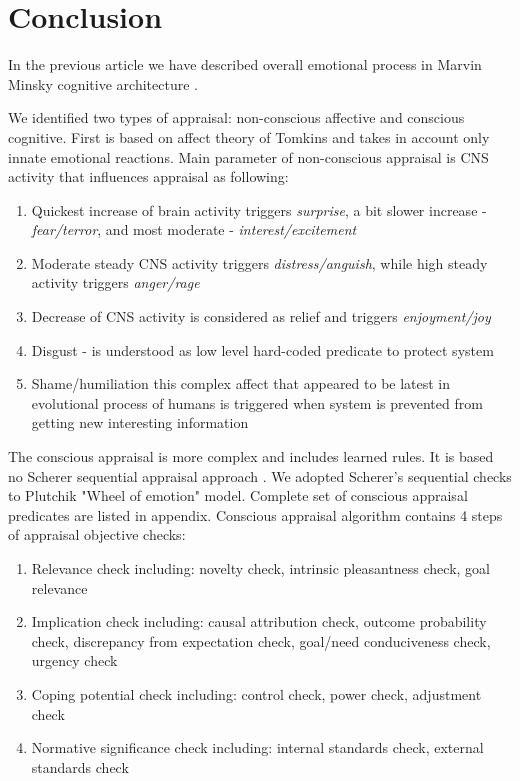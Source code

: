 \section{Conclusion}

In the previous article \cite{computational_emotional_thinking} we have described overall emotional process in Marvin Minsky cognitive architecture \cite{emotionmachine}. 

We identified two types of appraisal: non-conscious affective and conscious cognitive. First is based on affect theory of Tomkins \cite{primer_affect_psychology} and takes in account only innate emotional reactions. Main parameter of non-conscious appraisal is CNS activity that influences appraisal as following:

\begin{enumerate}
 \item  Quickest increase of brain activity triggers \emph{surprise}, a bit slower increase - \emph{fear/terror}, and most moderate - \emph{interest/excitement}
 \item  Moderate steady CNS activity triggers \emph{distress/anguish}, while high steady activity triggers \emph{anger/rage}
 \item  Decrease of CNS activity is considered as relief and triggers \emph{enjoyment/joy}
 \item  Disgust - is understood as low level hard-coded predicate to protect system
 \item  Shame/humiliation this complex affect that appeared to be latest in evolutional process of humans is triggered when system is prevented from getting new interesting information
\end{enumerate}

The conscious appraisal is more complex and includes learned rules. It is based no Scherer sequential appraisal approach \cite{appraisal_considered_as_a_process}. We adopted Scherer's sequential checks to Plutchik "Wheel of emotion" \cite{natureofemotions} model. Complete set of conscious appraisal predicates are listed in appendix. Conscious appraisal algorithm contains 4 steps of appraisal objective checks:

\begin{enumerate}
 \item  Relevance check including: novelty check, intrinsic pleasantness check, goal relevance
 \item  Implication check including: causal attribution check, outcome probability check, discrepancy from expectation check, goal/need conduciveness check, urgency check
 \item  Coping potential check including: control check, power check, adjustment check
 \item  Normative significance check including: internal standards check, external standards check
\end{enumerate}

